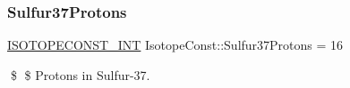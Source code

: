 \subsubsection{\texorpdfstring{Sulfur37\+Protons}{Sulfur37Protons}}
{\footnotesize\ttfamily \mbox{\hyperlink{group___isotope_const-_macros_ga5f18360b3e99483a35c32d789e62621c}{I\+S\+O\+T\+O\+P\+E\+C\+O\+N\+S\+T\+\_\+\+I\+NT}} Isotope\+Const\+::\+Sulfur37\+Protons = 16}

\$ \$ Protons in Sulfur-\/37. 